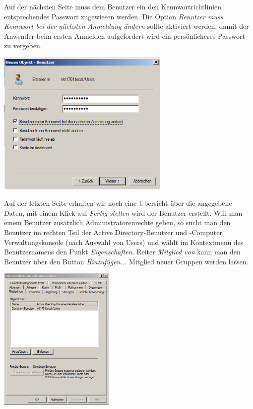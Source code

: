 \documentclass[12pt,a4paper,titlepage]{scrartcl} %
\begin{document}
Auf der nächsten Seite muss dem Benutzer ein den Kennwortrichtlinien entsprechendes Passwort zugewiesen werden. Die Option \emph{Benutzer muss Kennwort bei der nächsten Anmeldung ändern} sollte aktiviert werden, damit der Anwender beim ersten Anmelden aufgefordert wird ein persönlicheres Passwort zu vergeben.\\

	\begin{center}\includegraphics[height=7cm]{Bilder/051}\\ \end{center}
	
Auf der letzten Seite erhalten wir noch eine Übersicht über die angegebene Daten, mit einem Klick auf \emph{Fertig stellen} wird der Benutzer erstellt.
Will man einem Benutzer zusätzlich Administratorenrechte geben, so sucht man den Benutzer im rechten Teil der Active Directory-Benutzer und -Computer Verwaltungskonsole (nach Auswahl von Users) und wählt im Kontextmenü des Benutzernamens den Punkt \emph{Eigenschaften}. Reiter \emph{Mitglied von} kann man den Benutzer über den Button \emph{Hinzufügen...} Mitglied neuer Gruppen werden lassen.\\

	\begin{center}\includegraphics[height=7cm]{Bilder/052}\\ \end{center}
	
\end{document}
